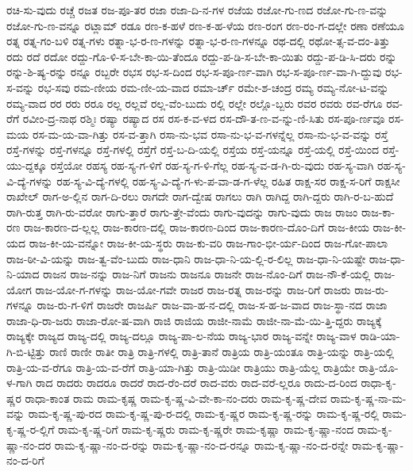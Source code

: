 {ರಚಿ-ಸು-ವುದು
ರಚ್ಚೆ
ರಜತ
ರಜ-ಪೂ-ತರ
ರಜಾ
ರಜಾ-ದಿ-ನ-ಗಳ
ರಜೆಯ
ರಜೋ-ಗು-ಣದ
ರಜೋ-ಗು-ಣ-ವನ್ನು
ರಜೋ-ಗು-ಣ-ವನ್ನೂ
ರಟ್ಲಾಮ್
ರಡೂ
ರಣ-ಕ-ಹಳೆ
ರಣ-ಕ-ಹ-ಳೆಯ
ರಣ-ರಂಗ
ರಣ-ರಂ-ಗ-ದಲ್ಲೇ
ರಣಾ
ರಣೆಯೂ
ರತ್ನ
ರತ್ನ-ಗಂ-ಬಳಿ
ರತ್ನ-ಗಳು
ರತ್ನಾ-ಭ-ರ-ಣ-ಗಳನ್ನು
ರತ್ನಾ-ಭ-ರ-ಣ-ಗಳನ್ನೂ
ರಥ-ದಲ್ಲಿ
ರಥೋ-ತ್ಸ-ವ-ದಂ-ತಿತ್ತು
ರದು
ರದೆ
ರದೋ
ರದ್ದು-ಗೊ-ಳಿ-ಸ-ಬೇ-ಕಾ-ಯಿ-ತೆಂದೂ
ರದ್ದು-ಪ-ಡಿ-ಸ-ಬೇ-ಕಾ-ಯಿತು
ರದ್ದು-ಪ-ಡಿ-ಸಿ-ದರು
ರನ್ನು
ರನ್ನು-ಶಿ-ಷ್ಯ-ರನ್ನು
ರನ್ನೂ
ರಬ್ಬರೇ
ರಭಸ
ರಭ-ಸ-ದಿಂದ
ರಭ-ಸ-ಪೂ-ರ್ಣ-ವಾಗಿ
ರಭ-ಸ-ಪೂ-ರ್ಣ-ವಾ-ಗಿ-ದ್ದುವು
ರಭ-ಸ-ವನ್ನು
ರಭ-ಸವು
ರಮ-ಣೀಯ
ರಮ-ಣೀ-ಯ-ವಾದ
ರಮಾ-ರ್ಚ್
ರಮೇ-ಶ-ಚಂದ್ರ
ರಮ್ಯ
ರಮ್ಯ-ನೋ-ಟ-ವನ್ನು
ರಮ್ಯ-ವಾದ
ರರ
ರರು
ರರೂ
ರಲ್ಲ
ರಲ್ಲವೆ
ರಲ್ಲ-ವೆಂ-ಬುದು
ರಲ್ಲಿ
ರಲ್ಲೇ
ರಲ್ಲೊ-ಬ್ಬರು
ರವರ
ರವರು
ರವ-ರೆಗೂ
ರವ-ರೆಗೆ
ರವೀಂ-ದ್ರ-ನಾಥ
ರಶ್ಮಿಃ
ರಷ್ಯಾ
ರಷ್ಯಾದ
ರಸ
ರಸ-ಕ-ವ-ಳದ
ರಸ-ದೌ-ತ-ಣ-ವ-ನ್ನು-ಣಿ-ಸಿತು
ರಸ-ಪೂ-ರ್ಣವೂ
ರಸ-ಮಯ
ರಸ-ಮ-ಯ-ವಾ-ಗಿತ್ತು
ರಸ-ವ-ತ್ತಾಗಿ
ರಸಾ-ನು-ಭವ
ರಸಾ-ನು-ಭ-ವ-ಗಳನ್ನೆಲ್ಲ
ರಸಾ-ನು-ಭ-ವ-ವನ್ನು
ರಸ್ತೆ
ರಸ್ತೆ-ಗಳನ್ನು
ರಸ್ತೆ-ಗಳನ್ನೂ
ರಸ್ತೆ-ಗಳಲ್ಲಿ
ರಸ್ತೆಗೆ
ರಸ್ತೆ-ಬ-ದಿ-ಯಲ್ಲಿ
ರಸ್ತೆಯ
ರಸ್ತೆ-ಯನ್ನೂ
ರಸ್ತೆ-ಯಲ್ಲಿ
ರಸ್ತೆ-ಯಿಂದ
ರಸ್ತೆ-ಯು-ದ್ದಕ್ಕೂ
ರಸ್ತೆಯೋ
ರಹಸ್ಯ
ರಹ-ಸ್ಯ-ಗ-ಳಿಗೆ
ರಹ-ಸ್ಯ-ಗ-ಳಿ-ಗೆಲ್ಲ
ರಹ-ಸ್ಯ-ವ-ಡ-ಗಿ-ರು-ವುದು
ರಹ-ಸ್ಯ-ವಾಗಿ
ರಹ-ಸ್ಯ-ವಿ-ದ್ಯೆ-ಗಳನ್ನು
ರಹ-ಸ್ಯ-ವಿ-ದ್ಯೆ-ಗಳಲ್ಲಿ
ರಹ-ಸ್ಯ-ವಿ-ದ್ಯೆ-ಗ-ಳು-ಪ-ವಾ-ಡ-ಗ-ಳೆಲ್ಲ
ರಹಿತ
ರಾಕ್ಷ-ಸರ
ರಾಕ್ಷ-ಸ-ರಿಗೆ
ರಾಕ್ಷಸೀ
ರಾಖೇಲ್
ರಾಗ-ಅ-ಲ್ಲಿನ
ರಾಗ-ದಿ-ರಲು
ರಾಗದೇ
ರಾಗ-ದ್ವೇಷ
ರಾಗಲು
ರಾಗಿ
ರಾಗಿದ್ದ
ರಾಗಿ-ದ್ದರು
ರಾಗಿ-ರ-ಬ-ಹುದೆ
ರಾಗಿ-ರುತ್ತ
ರಾಗಿ-ರು-ವರೋ
ರಾಗು-ತ್ತಾರೆ
ರಾಗು-ತ್ತೇ-ವೆಂದು
ರಾಗು-ವುದನ್ನು
ರಾಗು-ವುದು
ರಾಜ
ರಾಜಂ
ರಾಜ-ಕಾ-ರಣ
ರಾಜ-ಕಾರಣ-ದ-ಲ್ಲಲ್ಲ
ರಾಜ-ಕಾರಣ-ದಲ್ಲಿ
ರಾಜ-ಕಾರಣ-ದಿಂದ
ರಾಜ-ಕಾರಣ-ದೊಂ-ದಿಗೆ
ರಾಜ-ಕೀಯ
ರಾಜ-ಕೀ-ಯದ
ರಾಜ-ಕೀ-ಯ-ವನ್ನೋ
ರಾಜ-ಕೀ-ಯ-ಸ್ಥರು
ರಾಜ-ಕು-ವರಿ
ರಾಜ-ಗಾಂ-ಭೀ-ರ್ಯ-ದಿಂದ
ರಾಜ-ಗೋ-ಪಾಲಾ
ರಾಜ-ಠೀ-ವಿ-ಯನ್ನು
ರಾಜ-ತ್ವ-ವೆಂ-ಬುದು
ರಾಜ-ಧಾನಿ
ರಾಜ-ಧಾ-ನಿ-ಯ-ಲ್ಲಿ-ರ-ಲಿಲ್ಲ
ರಾಜ-ಧಾ-ನಿ-ಯಷ್ಟೇ
ರಾಜ-ಧಾ-ನಿ-ಯಾದ
ರಾಜನ
ರಾಜ-ನನ್ನು
ರಾಜ-ನಿಗೆ
ರಾಜನು
ರಾಜನೂ
ರಾಜನೇ
ರಾಜ-ನೊಂ-ದಿಗೆ
ರಾಜ-ನೌ-ಕೆ-ಯಲ್ಲಿ
ರಾಜ-ಯೋಗ
ರಾಜ-ಯೋ-ಗ-ಗಳನ್ನು
ರಾಜ-ಯೋ-ಗವೇ
ರಾಜರ
ರಾಜ-ರತ್ನ
ರಾಜ-ರನ್ನು
ರಾಜ-ರಿಗೆ
ರಾಜರು
ರಾಜ-ರು-ಗಳನ್ನೂ
ರಾಜ-ರು-ಗ-ಳಿಗೆ
ರಾಜರೇ
ರಾಜರ್ಷಿ
ರಾಜ-ವಾ-ಹ-ನ-ದಲ್ಲಿ
ರಾಜ-ಸ-ಹ-ಜ-ವಾದ
ರಾಜ-ಸ್ಥಾ-ನದ
ರಾಜಾ
ರಾಜಾ-ಧಿ-ರಾ-ಜರು
ರಾಜಾ-ರೋ-ಷ-ವಾಗಿ
ರಾಜಿ
ರಾಜಿಯ
ರಾಜೀ-ನಾಮೆ
ರಾಜೀ-ನಾ-ಮೆ-ಯಿ-ತ್ತಿ-ದ್ದರು
ರಾಜ್ಯಕ್ಕೆ
ರಾಜ್ಯಕ್ಕೇ
ರಾಜ್ಯದ
ರಾಜ್ಯ-ದಲ್ಲಿ
ರಾಜ್ಯ-ದಲ್ಲೂ
ರಾಜ್ಯ-ಪಾ-ಲ-ನೆಯ
ರಾಜ್ಯ-ಭಾರ
ರಾಜ್ಯ-ವನ್ನೇ
ರಾಜ್ಯ-ವಾಳ
ರಾಡಿ-ಯಾ-ಗಿ-ಬಿ-ಟ್ಟಿತ್ತು
ರಾಣಿ
ರಾಣೀ
ರಾತೀ
ರಾತ್ರಿ
ರಾತ್ರಿ-ಗಳಲ್ಲಿ
ರಾತ್ರಿ-ತಾನೆ
ರಾತ್ರಿಯ
ರಾತ್ರಿ-ಯಂತೂ
ರಾತ್ರಿ-ಯನ್ನು
ರಾತ್ರಿ-ಯಲ್ಲಿ
ರಾತ್ರಿ-ಯ-ವ-ರೆಗೂ
ರಾತ್ರಿ-ಯ-ವ-ರೆಗೆ
ರಾತ್ರಿ-ಯಾ-ಗಿತ್ತು
ರಾತ್ರಿ-ಯಿಡೀ
ರಾತ್ರಿಯು
ರಾತ್ರಿ-ಯೆಲ್ಲ
ರಾತ್ರಿಯೇ
ರಾತ್ರಿ-ಯೊ-ಳ-ಗಾಗಿ
ರಾದ
ರಾದರು
ರಾದರೂ
ರಾದರೆ
ರಾದ-ರೆಂ-ದರೆ
ರಾದ-ವರು
ರಾದ-ವರೆ-ಲ್ಲರೂ
ರಾದು-ದ-ರಿಂದ
ರಾಧಾ-ಕೃ-ಷ್ಣರ
ರಾಧಾ-ಕಾಂತ
ರಾಮ
ರಾಮ-ಕೃಷ್ಣ
ರಾಮ-ಕೃ-ಷ್ಣ-ವಿ-ವೇ-ಕಾ-ನಂ-ದರು
ರಾಮ-ಕೃ-ಷ್ಣ-ದೇವ
ರಾಮ-ಕೃ-ಷ್ಣ-ನಾ-ಮ-ವನ್ನು
ರಾಮ-ಕೃ-ಷ್ಣ-ಪು-ರದ
ರಾಮ-ಕೃ-ಷ್ಣ-ಪು-ರ-ದಲ್ಲಿ
ರಾಮ-ಕೃ-ಷ್ಣರ
ರಾಮ-ಕೃ-ಷ್ಣ-ರನ್ನು
ರಾಮ-ಕೃ-ಷ್ಣ-ರಲ್ಲಿ
ರಾಮ-ಕೃ-ಷ್ಣ-ರ-ಲ್ಲಿಗೆ
ರಾಮ-ಕೃ-ಷ್ಣ-ರಿಗೆ
ರಾಮ-ಕೃ-ಷ್ಣರು
ರಾಮ-ಕೃ-ಷ್ಣರೇ
ರಾಮ-ಕೃಷ್ಣಾ
ರಾಮ-ಕೃ-ಷ್ಣಾ-ನಂದ
ರಾಮ-ಕೃ-ಷ್ಣಾ-ನಂ-ದರ
ರಾಮ-ಕೃ-ಷ್ಣಾ-ನಂ-ದ-ರನ್ನು
ರಾಮ-ಕೃ-ಷ್ಣಾ-ನಂ-ದ-ರನ್ನೂ
ರಾಮ-ಕೃ-ಷ್ಣಾ-ನಂ-ದ-ರನ್ನೇ
ರಾಮ-ಕೃ-ಷ್ಣಾ-ನಂ-ದ-ರಿಗೆ
}

